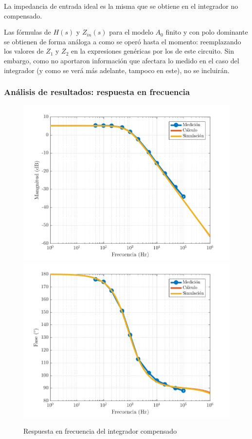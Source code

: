 \documentclass[../../main.tex]{subfiles}
\begin{document}
La impedancia de entrada ideal es la misma que se obtiene en el integrador no compensado.\par

Las f\'ormulas de $H(s)$ y $Z_{in}(s)$ para el modelo $A_0$ finito y con polo dominante se obtienen de forma an\'aloga a como se oper\'o hasta el momento: reemplazando los valores de $Z_1$ y $Z_2$ en la expresiones gen\'ericas por los de este circuito. Sin embargo, como no aportaron informaci\'on que afectara lo medido en el caso del integrador (y como se ver\'a m\'as adelante, tampoco en este), no se incluir\'an. 






\subsubsection{An\'alisis de resultados: respuesta en frecuencia}

\begin{figure}  [H]
	\centering
	\label{fig:icomp-hf}
	\includegraphics[scale=0.7]{fotos/tc_tp2_ej4_icomp_Hf_mag.png}
	\includegraphics[scale=0.7]{fotos/tc_tp2_ej4_icomp_Hf_fase.png}
	\caption{Respuesta en frecuencia del integrador compensado}
\end{figure}
\end{document}
